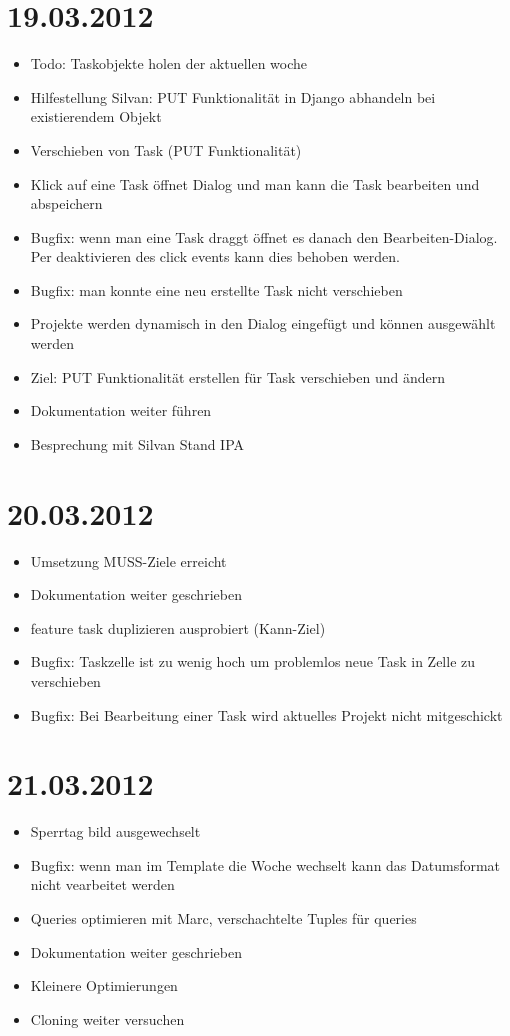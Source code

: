 \section{19.03.2012}
    \begin{itemize}
        \item Todo: Taskobjekte holen der aktuellen woche
        \item Hilfestellung Silvan: PUT Funktionalität in Django abhandeln bei existierendem Objekt
        \item Verschieben von Task (PUT Funktionalität)
        \item Klick auf eine Task öffnet Dialog und man kann die Task bearbeiten und abspeichern
        \item Bugfix: wenn man eine Task draggt öffnet es danach den Bearbeiten-Dialog. Per deaktivieren des click events kann dies behoben werden.
        \item Bugfix: man konnte eine neu erstellte Task nicht verschieben
        \item Projekte werden dynamisch in den Dialog eingefügt und können ausgewählt werden
        \item Ziel: PUT Funktionalität erstellen für Task verschieben und ändern
        \item Dokumentation weiter führen
        \item Besprechung mit Silvan Stand IPA
    \end{itemize}
\section{20.03.2012}
    \begin{itemize}
        \item Umsetzung MUSS-Ziele erreicht
        \item Dokumentation weiter geschrieben
        \item feature task duplizieren ausprobiert (Kann-Ziel)
        \item Bugfix: Taskzelle ist zu wenig hoch um problemlos neue Task in Zelle zu verschieben
        \item Bugfix: Bei Bearbeitung einer Task wird aktuelles Projekt nicht mitgeschickt
    \end{itemize}
\section{21.03.2012}
    \begin{itemize}
        \item Sperrtag bild ausgewechselt
        \item Bugfix: wenn man im Template die Woche wechselt kann das Datumsformat nicht vearbeitet werden
        \item Queries optimieren mit Marc, verschachtelte Tuples für queries
        \item Dokumentation weiter geschrieben
        \item Kleinere Optimierungen
        \item Cloning weiter versuchen
    \end{itemize}
